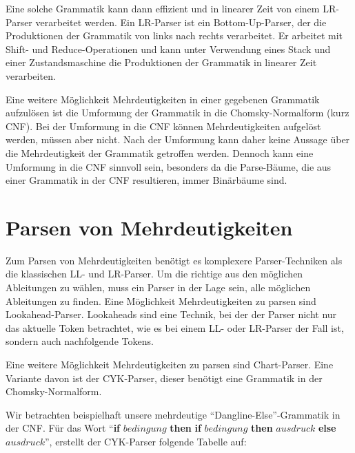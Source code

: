 \documentclass[runningheads]{llncs}
\begin{document}
	Eine solche Grammatik kann dann effizient und in linearer Zeit von einem LR-Parser verarbeitet werden.
	Ein LR-Parser ist ein Bottom-Up-Parser, der die Produktionen der Grammatik von links nach rechts verarbeitet.
	Er arbeitet mit Shift- und Reduce-Operationen und kann unter Verwendung eines Stack und einer Zustandsmaschine
	die Produktionen der Grammatik in linearer Zeit verarbeiten.

	Eine weitere Möglichkeit Mehrdeutigkeiten in einer gegebenen Grammatik aufzulösen
	ist die Umformung der Grammatik in die Chomsky-Normalform (kurz CNF).
	Bei der Umformung in die CNF können Mehrdeutigkeiten aufgelöst werden, müssen aber nicht.
	Nach der Umformung kann daher keine Aussage über die Mehrdeutigkeit der Grammatik getroffen werden.
	Dennoch kann eine Umformung in die CNF sinnvoll sein, besonders da die Parse-Bäume,
	die aus einer Grammatik in der CNF resultieren, immer Binärbäume sind.



	\section{Parsen von Mehrdeutigkeiten}\label{sec:parsen-von-mehrdeutigkeiten}

	Zum Parsen von Mehrdeutigkeiten benötigt es komplexere Parser-Techniken als die klassischen LL- und LR-Parser.
	Um die richtige aus den möglichen Ableitungen zu wählen,
	muss ein Parser in der Lage sein, alle möglichen Ableitungen zu finden.
	Eine Möglichkeit Mehrdeutigkeiten zu parsen sind Lookahead-Parser.
	Lookaheads sind eine Technik, bei der der Parser nicht nur das aktuelle Token betrachtet,
	wie es bei einem LL- oder LR-Parser der Fall ist, sondern auch nachfolgende Tokens.

	Eine weitere Möglichkeit Mehrdeutigkeiten zu parsen sind Chart-Parser.
	Eine Variante davon ist der CYK-Parser,
	dieser benötigt eine Grammatik in der Chomsky-Normalform.

	Wir betrachten beispielhaft unsere mehrdeutige ``Dangline-Else''-Grammatik in der CNF.
	Für das Wort ``\textbf{if} $bedingung$ \textbf{then} \textbf{if} $bedingung$ \textbf{then} $ausdruck$ \textbf{else} $ausdruck$'',
	erstellt der CYK-Parser folgende Tabelle auf:
\end{document}
